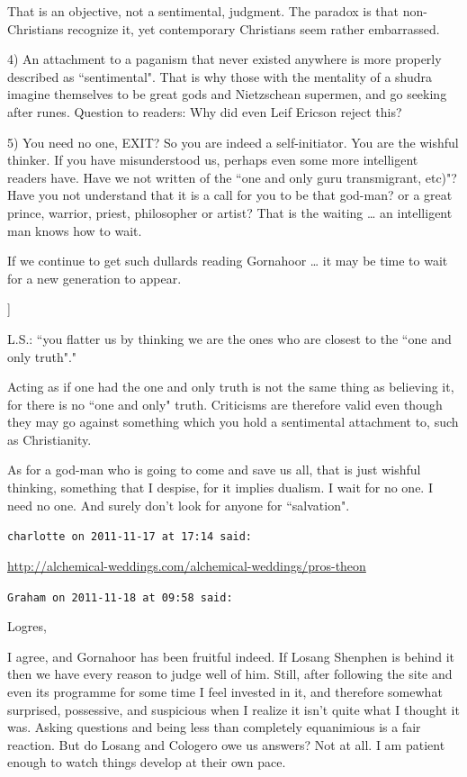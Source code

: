 \begin{footnotesize}
\begin{sffamily}
That is an objective, not a sentimental, judgment. The paradox is that non-Christians recognize it, yet contemporary Christians seem rather embarrassed.

4) An attachment to a paganism that never existed anywhere is more properly described as ``sentimental". That is why those with the mentality of a shudra imagine themselves to be great gods and Nietzschean supermen, and go seeking after runes. Question to readers: Why did even Leif Ericson reject this?

5) You need no one, EXIT? So you are indeed a self-initiator. You are the wishful thinker. If you have misunderstood us, perhaps even some more intelligent readers have. Have we not written of the ``one and only guru transmigrant, etc)"? Have you not understand that it is a call for you to be that god-man? or a great prince, warrior, priest, philosopher or artist? That is the waiting … an intelligent man knows how to wait.

If we continue to get such dullards reading Gornahoor … it may be time to wait for a new generation to appear.

]

L.S.: ``you flatter us by thinking we are the ones who are closest to the ``one and only truth"."

Acting as if one had the one and only truth is not the same thing as believing it, for there is no ``one and only" truth. Criticisms are therefore valid even though they may go against something which you hold a sentimental attachment to, such as Christianity.

As for a god-man who is going to come and save us all, that is just wishful thinking, something that I despise, for it implies dualism. I wait for no one. I need no one. And surely don't look for anyone for ``salvation".


\hfill

\texttt{charlotte on 2011-11-17 at 17:14 said: }

\url{http://alchemical-weddings.com/alchemical-weddings/pros-theon}


\hfill

\texttt{Graham on 2011-11-18 at 09:58 said: }

Logres,

I agree, and Gornahoor has been fruitful indeed. If Losang Shenphen is behind it then we have every reason to judge well of him. Still, after following the site and even its programme for some time I feel invested in it, and therefore somewhat surprised, possessive, and suspicious when I realize it isn't quite what I thought it was. Asking questions and being less than completely equanimious is a fair reaction. But do Losang and Cologero owe us answers? Not at all. I am patient enough to watch things develop at their own pace.


\end{sffamily}
\end{footnotesize}
